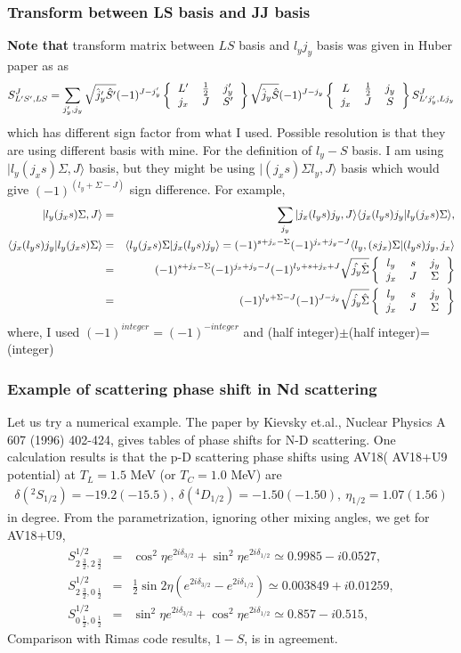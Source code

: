 \documentclass[10pt]{book}
\newcommand{\bea}{\begin{eqnarray}}
\newcommand{\eea}{\end{eqnarray}}
\newcommand{\no}{\nonumber \\}
\def\la{\langle}
\def\ra{\rangle}
\newcommand{\sixjsymbol}[6]
{\left\{\begin{tabular}{ccc} {$#1$}&{$#2$}&{$#3$}\\
                             {$#4$}&{$#5$}&{$#6$} \end{tabular}\right\}}
\begin{document}
\subsubsection{Transform between LS basis and JJ basis}
{\bf Note that} transform matrix between $LS$ basis and $l_y j_y$ basis was given in Huber paper as
as
\bea
S^{J}_{L' S',LS}
=\sum_{j'_y,j_y} \sqrt{\hat{j}'_y\hat{S}'}(-1)^{J-j'_y}
                 \sixjsymbol{L'}{\frac{1}{2}}{j'_y}{j_x}{J}{S'}
                 \sqrt{\hat{j}_y\hat{S}}(-1)^{J-j_y}
                 \sixjsymbol{L}{\frac{1}{2}}{j_y}{j_x}{J}{S}
                 S^J_{L' j'_y,L j_y}
\eea
which has different sign factor from what I used.
Possible resolution is that they are using different basis with mine.
For the definition of $l_y-S$ basis.
I am using $|l_y (j_x s) \Sigma,J\ra$ basis, but they might be using
$|(j_x s)\Sigma l_y, J\ra$ basis which would give 
$(-1)^{(l_y+\Sigma-J)}$ sign difference.
For example,
\bea
|l_y (j_x s)\Sigma,J\ra
&=&\sum_{j_y} |j_x(l_y s) j_y, J\ra
  \la j_x(l_y s) j_y |l_y (j_x s)\Sigma\ra,\no
\la j_x(l_y s) j_y |l_y (j_x s)\Sigma\ra
&=& \la l_y (j_x s)\Sigma|j_x(l_y s) j_y \ra
  =(-1)^{s+j_x-\Sigma}(-1)^{j_x+j_y-J}
   \la l_y, (s j_x)\Sigma| (l_y s) j_y, j_x\ra \no
  &=&(-1)^{s+j_x-\Sigma}(-1)^{j_x+j_y-J}
   (-1)^{l_y+s+j_x+J} 
   \sqrt{\hat{j_y}\hat{\Sigma}}
   \sixjsymbol{l_y}{s}{j_y}{j_x}{J}{\Sigma} \no
  &=&(-1)^{l_y+\Sigma-J}(-1)^{J-j_y}  
    \sqrt{\hat{j_y}\hat{\Sigma}}
     \sixjsymbol{l_y}{s}{j_y}{j_x}{J}{\Sigma}        
\eea
where, I used $(-1)^{integer}=(-1)^{-integer}$
and (half integer)$\pm$(half integer)=(integer)

\subsubsection{Example of scattering phase shift in Nd scattering} 
Let us try a numerical example. 
The paper by Kievsky et.al., Nuclear Physics A 607 (1996) 402-424,
gives tables of phase shifts for N-D scattering. 
One calculation results is that the p-D scattering 
phase shifts using AV18( AV18+U9 potential) at $T_L=1.5$ MeV (or $T_C=1.0$ MeV) are
\bea 
\delta({}^2S_{1/2})=-19.2(-15.5),\ \delta({}^4D_{1/2})=-1.50(-1.50),\ \eta_{1/2}=1.07(1.56)
\eea 
in degree.
From the parametrization, ignoring other mixing angles, we get for AV18+U9,
\bea 
S^{1/2}_{2\ \frac{3}{2},2\ \frac{3}{2}}&=&
 \cos^2\eta e^{2i\delta_{3/2}}+\sin^2\eta e^{2i\delta_{1/2}}\simeq
  0.9985-i 0.0527,  \no 
S^{1/2}_{2\ \frac{3}{2},0\ \frac{1}{2}}&=& 
 \frac{1}{2}\sin 2\eta (e^{2i\delta_{3/2}}-e^{2i\delta_{1/2}})\simeq 
 0.003849+i 0.01259, \no 
S^{1/2}_{0\ \frac{1}{2},0\ \frac{1}{2}}&=& 
 \sin^2\eta e^{2i\delta_{3/2}}+\cos^2\eta e^{2i\delta_{1/2}}\simeq
 0.857-i 0.515,
\eea 
Comparison with Rimas code results, $1-S$,  is in agreement.
\end{document}
